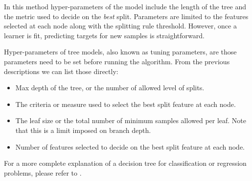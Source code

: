 In this method hyper-parameters of the model include the length of the tree and the metric used to decide on the \textit{best} split. Parameters are limited to the features selected at each node along with the splitting rule threshold. However, once a learner is fit, predicting targets for new samples is straightforward. 

Hyper-parameters of tree models, also known as tuning parameters, are those parameters need to be set before running the algorithm. From the previous descriptions we can list those directly:

\begin{itemize}
	\item Max depth of the tree, or the number of allowed level of splits.
	\item The criteria or measure used to select the best split feature at each node.
	\item The leaf size or the total number of minimum samples allowed per leaf. Note that this is a limit imposed on  branch depth. 
	\item Number of features selected to decide on the best split feature at each node.
\end{itemize}



For a more complete explanation of a decision tree for classification or regression problems, please refer to \cite{breiman-cart84}.


\textit{}

\textit{}

\textit{}

\textit{}